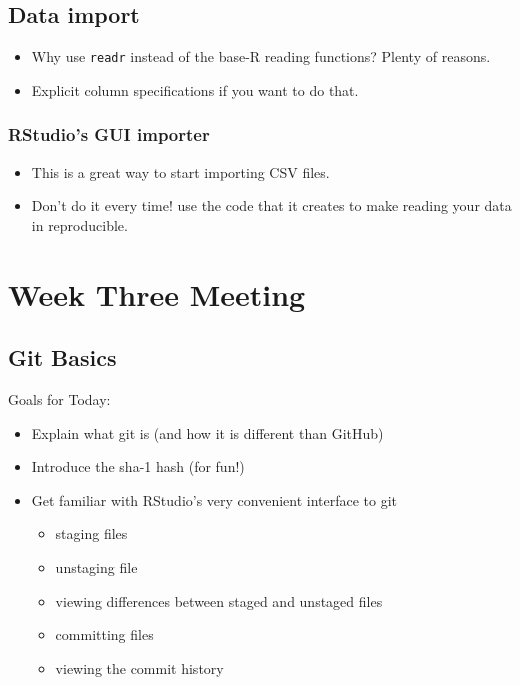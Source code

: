 \documentclass[]{book}
\providecommand{\tightlist}{%
  \setlength{\itemsep}{0pt}\setlength{\parskip}{0pt}}
\theoremstyle{definition}
\theoremstyle{definition}
\theoremstyle{remark}
\begin{document}
\section{Data import}\label{data-import}

\begin{itemize}
\tightlist
\item
  Why use \texttt{readr} instead of the base-R reading functions? Plenty
  of reasons.
\item
  Explicit column specifications if you want to do that.
\end{itemize}

\subsection{RStudio's GUI importer}\label{rstudios-gui-importer}

\begin{itemize}
\tightlist
\item
  This is a great way to start importing CSV files.
\item
  Don't do it every time! use the code that it creates to make reading
  your data in reproducible.
\end{itemize}

\chapter{Week Three Meeting}\label{week3}

\section{Git Basics}\label{git-basics}

Goals for Today:

\begin{itemize}
\tightlist
\item
  Explain what git is (and how it is different than GitHub)
\item
  Introduce the sha-1 hash (for fun!)
\item
  Get familiar with RStudio's very convenient interface to git

  \begin{itemize}
  \tightlist
  \item
    staging files
  \item
    unstaging file
  \item
    viewing differences between staged and unstaged files
  \item
    committing files
  \item
    viewing the commit history
  \end{itemize}
\end{itemize}
\end{document}
